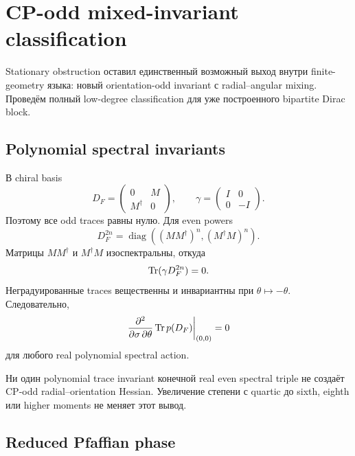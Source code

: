 \chapter{CP-odd mixed-invariant classification}

Stationary obstruction оставил единственный возможный выход внутри
finite-geometry языка: новый orientation-odd invariant с radial--angular
mixing. Проведём полный low-degree classification для уже построенного
bipartite Dirac block.

\section{Polynomial spectral invariants}

В chiral basis
\begin{equation}
 D_F=\begin{pmatrix}0&M\\M^\dagger&0\end{pmatrix},
 \qquad
 \gamma=\begin{pmatrix}I&0\\0&-I\end{pmatrix}.
\end{equation}
Поэтому все odd traces равны нулю. Для even powers
\begin{equation}
 D_F^{2n}=\operatorname{diag}
 \left((MM^\dagger)^n,(M^\dagger M)^n\right).
\end{equation}
Матрицы $MM^\dagger$ и $M^\dagger M$ изоспектральны, откуда
\begin{equation}
 \operatorname{Tr}(\gamma D_F^{2n})=0.
\end{equation}
Неградуированные traces вещественны и инвариантны при
$\theta\mapsto-\theta$. Следовательно,
\begin{equation}
 \left.
 \frac{\partial^2}{\partial\sigma\,\partial\theta}
 \operatorname{Tr} p(D_F)
 \right|_{(0,0)}=0
\end{equation}
для любого real polynomial spectral action.

\begin{theorem}
Ни один polynomial trace invariant конечной real even spectral triple не
создаёт CP-odd radial--orientation Hessian. Увеличение степени с quartic до
sixth, eighth или higher moments не меняет этот вывод.
\end{theorem}

\section{Reduced Pfaffian phase}

